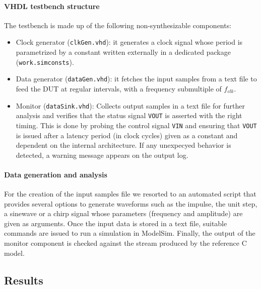 \paragraph{VHDL testbench structure} The testbench is made up of the following non-synthesizable components:
\begin{itemize}
	\item Clock generator (\texttt{clkGen.vhd}): it generates a clock signal whose period is parametrized by a constant written externally in a dedicated package (\texttt{work.simconsts}).
	\item Data generator (\texttt{dataGen.vhd}): it fetches the input samples from a text file to feed the DUT at regular intervals, with a frequency submultiple of $f_{clk}$.
	\item Monitor (\texttt{dataSink.vhd}): Collects output samples in a text file for further analysis and verifies that the status signal \texttt{VOUT} is asserted with the right timing. This is done by probing the control signal \texttt{VIN} and ensuring that \texttt{VOUT} is issued after a latency period (in clock cycles) given as a constant and dependent on the internal architecture. If any unexpecyed behavior is detected, a warning message appears on the output log.
\end{itemize}

\paragraph{Data generation and analysis} For the creation of the input samples file we resorted to an automated script that provides several options to generate waveforms such as the impulse, the unit step, a sinewave or a chirp signal whose parameters (frequency and amplitude) are given as arguments. Once the input data is stored in a text file, suitable commands are issued to run a simulation in ModelSim. Finally, the output of the monitor component is checked against the stream produced by the reference C model. 

\subsection{Results}
